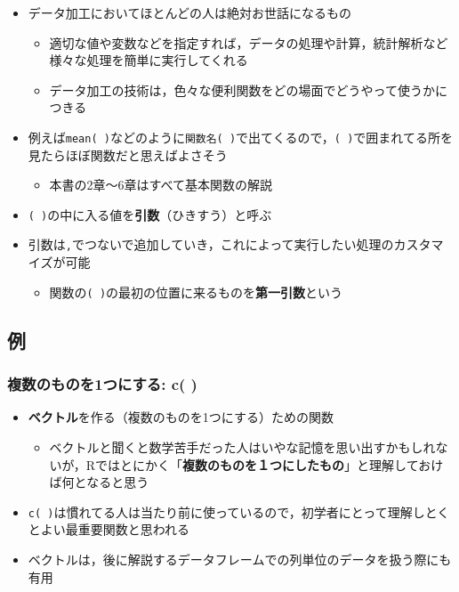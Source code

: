\documentclass[
  xelatex,ja=standard, b5paper]{bxjsbook}
\providecommand{\tightlist}{%
  \setlength{\itemsep}{0pt}\setlength{\parskip}{0pt}}
\begin{document}
\begin{itemize}
\tightlist
\item
  データ加工においてほとんどの人は絶対お世話になるもの

  \begin{itemize}
  \tightlist
  \item
    適切な値や変数などを指定すれば，データの処理や計算，統計解析など様々な処理を簡単に実行してくれる
  \item
    データ加工の技術は，色々な便利関数をどの場面でどうやって使うかにつきる
  \end{itemize}
\item
  例えば\texttt{mean(\ )}などのように\texttt{関数名(\ )}で出てくるので，\texttt{(\ )}で囲まれてる所を見たらほぼ関数だと思えばよさそう

  \begin{itemize}
  \tightlist
  \item
    本書の2章～6章はすべて基本関数の解説
  \end{itemize}
\item
  \texttt{(\ )}の中に入る値を\textbf{引数}（ひきすう）と呼ぶ
\item
  引数は\texttt{,}でつないで追加していき，これによって実行したい処理のカスタマイズが可能

  \begin{itemize}
  \tightlist
  \item
    関数の\texttt{(\ )}の最初の位置に来るものを\textbf{第一引数}という
  \end{itemize}
\end{itemize}

\hypertarget{p-function-ex}{%
\subsection{例}\label{p-function-ex}}

\hypertarget{p-function-ex-c}{%
\subsubsection{複数のものを1つにする: c( )}\label{p-function-ex-c}}

\begin{itemize}
\tightlist
\item
  \textbf{ベクトル}を作る（複数のものを1つにする）ための関数

  \begin{itemize}
  \tightlist
  \item
    ベクトルと聞くと数学苦手だった人はいやな記憶を思い出すかもしれないが，Rではとにかく「\textbf{複数のものを１つにしたもの}」と理解しておけば何となると思う
  \end{itemize}
\item
  \texttt{c(\ )}は慣れてる人は当たり前に使っているので，初学者にとって理解しとくとよい最重要関数と思われる
\item
  ベクトルは，後に解説するデータフレームでの列単位のデータを扱う際にも有用
\end{itemize}
\end{document}
